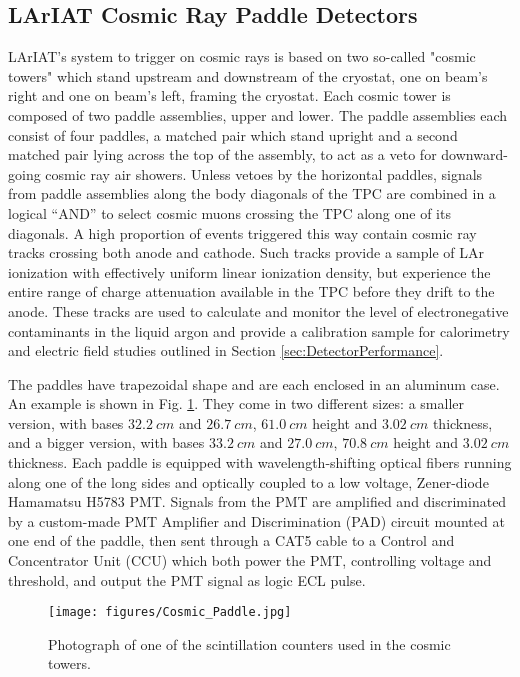 \subsection{LArIAT Cosmic Ray Paddle Detectors}\label{sec:CosmicRayPaddle}

LArIAT's system to trigger on cosmic rays is based on two so-called "cosmic towers" which stand  upstream and downstream of the cryostat, one on beam's right and one on beam's left, framing the cryostat.  Each cosmic tower is composed of two paddle assemblies, upper and lower.  The paddle assemblies each consist of four paddles, a matched pair which stand upright and a second matched pair lying across the top  of the assembly, to act as a veto for downward-going cosmic ray air showers.  Unless vetoes by the horizontal paddles, signals from paddle assemblies along the body diagonals of the TPC are combined in a logical ``AND'' to select cosmic muons crossing the TPC along one of its diagonals. A high proportion of events triggered this way contain cosmic ray tracks crossing both anode and cathode.  Such tracks provide a sample of LAr ionization with effectively uniform linear ionization density, but experience the entire range of charge attenuation available in the TPC before they drift to the anode. These tracks are used to calculate and monitor the level of electronegative contaminants in the liquid argon and provide a calibration sample for calorimetry and electric field studies outlined in Section \ref{sec:DetectorPerformance}.

The paddles have trapezoidal shape and are each enclosed in an aluminum case. An example is shown in Fig. \ref{pic:cosmicpaddle}. They come in two different sizes: a smaller version, with bases $32.2~cm$ and $26.7~cm$, $61.0~cm$ height and $3.02~cm$ thickness, and a bigger version, with bases $33.2~cm$ and $27.0~cm$, $70.8~cm$ height and $3.02~cm$ thickness. Each paddle is equipped with wavelength-shifting optical fibers running along one of the long sides and optically coupled to a low voltage, Zener-diode Hamamatsu H5783 PMT.  Signals from the PMT are amplified and discriminated by a custom-made PMT Amplifier and Discrimination (PAD) circuit mounted at one end of the paddle, then sent through a CAT5 cable to a Control and Concentrator Unit (CCU) which both power the PMT, controlling voltage and threshold, and output the PMT signal as logic ECL pulse.

\begin{figure}[h!]
 \centering
 \texttt{[image: figures/Cosmic\_Paddle.jpg]}
\caption{
Photograph of one of the scintillation counters used in the cosmic towers. 
} 
\label{pic:cosmicpaddle}
\end{figure}


